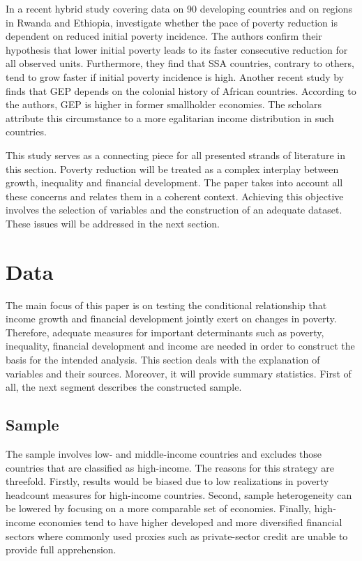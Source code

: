 \documentclass[12pt, a4paper]{article}
\begin{document}
In a recent hybrid study covering data on 90 developing countries and on regions in Rwanda and Ethiopia,  investigate whether the pace of poverty reduction is dependent on reduced initial poverty incidence. The authors confirm their hypothesis that lower initial poverty leads to its faster consecutive reduction for all observed units. Furthermore, they find that SSA countries, contrary to others, tend to grow faster if initial poverty incidence is high. Another recent study by  finds that GEP depends on the colonial history of African countries. According to the authors, GEP is higher in former smallholder economies. The scholars attribute this circumstance to a more egalitarian income distribution in such countries.

This study serves as a connecting piece for all presented strands of literature in this section. Poverty reduction will be treated as a complex interplay between growth, inequality and financial development. The paper takes into account all these concerns and relates them in a coherent context. Achieving this objective involves the selection of variables and the construction of an adequate dataset. These issues will be addressed in the next section.

\section{Data} \label{data}

The main focus of this paper is on testing the conditional relationship that income growth and financial development jointly exert on changes in poverty. Therefore, adequate measures for important determinants such as poverty, inequality, financial development and income are needed in order to construct the basis for the intended analysis. This section deals with the explanation of variables and their sources. Moreover, it will provide summary statistics. First of all, the next segment describes the constructed sample. 

\subsection{Sample}

The sample involves low- and middle-income countries and excludes those countries that are classified as high-income. The reasons for this strategy are threefold. Firstly, results would be biased due to low realizations in poverty headcount measures for high-income countries. Second, sample heterogeneity can be lowered by focusing on a more comparable set of economies. Finally, high-income economies tend to have higher developed and more diversified financial sectors where commonly used proxies such as private-sector credit are unable to provide full apprehension.
\end{document}
